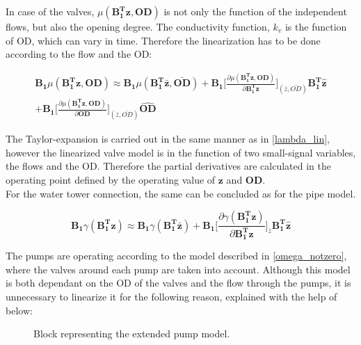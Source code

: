 In case of the valves, $\mu(\bm{{B_1^{T}}}\bm{z}, \bm{OD})$ is not only the function of the independent flows, but also the opening degree. The conductivity function, $k_v$ is the function of OD, which can vary in time. Therefore the linearization has to be done according to the flow and the OD: 

\begin{equation}
\begin{split}
  \bm{B_1} \mu(\bm{{B_1^{T}}}\bm{z}, \bm{OD}) \approx \bm{B_1} \mu(\bm{B_1^T \bar{ z}}, \bm{\bar{OD}}) + 
  \bm{B_1} \bigg[ \frac{\partial{\mu(\bm{{B_1^{T}}}\bm{z}, \bm{OD})}}{{\partial{\bm{{B_1^{T}}}\bm{z}}}}  \bigg]_{(\bar{z}, \bar{OD})} \bm{{B_1^{T}}} \bm{\hat{z}}
\\ +  \bm{B_1} \bigg[ \frac{\partial{\mu(\bm{{B_1^{T}}}\bm{z}, \bm{OD})}}{{\partial{\bm{OD}}}}  \bigg]_{(\bar{z}, \bar{OD})} \bm{\hat{OD}}
\label{mu_lin}
\end{split}
\end{equation}


The Taylor-expansion is carried out in the same manner as in \eqref{lambda_lin}, however the linearized valve model is in the function of two small-signal variables, the flows and the OD. Therefore the partial derivatives are calculated in the operating point defined by the operating value of $\bm{z}$ and $\bm{OD}$. 
\\
For the water tower connection, the same can be concluded as for the pipe model. 

\begin{equation}
  \bm{B_1} \gamma(\bm{{B_1^{T}}}\bm{z}) \approx  \bm{B_1} \gamma(\bm{B_1^T \bar{ z}}) + \bm{B_1} \bigg[ \frac{\partial{\gamma(\bm{{B_1^{T}}}\bm{z})}}{{\partial{\bm{{B_1^{T}}}\bm{z}}}}   \bigg]_{\bar{z}} \bm{{B_1^{T}}}\bm{\hat{z}}
\label{gamma_lin}
\end{equation}

The pumps are operating according to the model described in \eqref{omega_notzero}, where the valves around each pump are taken into account. Although this model is both dependant on the OD of the valves and the flow through the pumps, it is unnecessary to linearize it for the following reason, explained with the help of  below: 

\begin{figure}[H]
\centering
 
\caption{Block representing the extended pump model.}
\label{fig:pump_model_block}
\end{figure}

